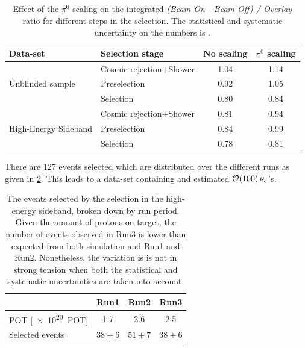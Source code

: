 \begin{table}[htb]
    \centering
    \begin{tabular}{@{}llcc@{}}
\toprule
    Data-set                                  & Selection stage   & No scaling & $\pi^0$ scaling \\ \midrule
\multirow{3}{*}{Unblinded sample}     & Cosmic rejection+Shower & 1.04       & 1.14         \\
                                      & Preselection            & 0.92       & 1.05        \\
                                      & Selection               & 0.80       & 0.84         \\
\multirow{3}{*}{High-Energy Sideband} & Cosmic rejection+Shower & 0.81       & 0.94         \\
                                      & Preselection            & 0.84       & 0.99        \\
                                      & Selection               & 0.78       & 0.81         \\ \bottomrule
\end{tabular} 
    \caption{Effect of the $\pi^0$ scaling on the integrated \textit{(Beam On - Beam Off) / Overlay} ratio for different steps in the selection. The statistical and systematic uncertainty on the numbers is .}
    \label{tab:nuecc:pi0scaling}
\end{table}

There are 127 events selected which are distributed over the different runs as given in \cref{tab:nuecc:sideband_run_sel_events}. This leads to a data-set containing and estimated $\order{100} \, \nu_e$'s.

\begin{table}[htb]
    \centering
\begin{tabular}{@{}lccc@{}}
\toprule
                & Run1 & Run2 & Run3 \\ \midrule
POT [\SI{e20}{POT}]             & 1.7  & 2.6  & 2.5  \\
Selected events & $38\pm6$   & $51\pm7$   & $38\pm6$   \\ \bottomrule
\end{tabular}
    \caption{The events selected by the \nuecc selection in the high-energy sideband, broken down by run period. Given the amount of protons-on-target, the number of events observed in Run3 is lower than expected from both simulation and Run1 and Run2. Nonetheless, the variation is is not in strong tension when both the statistical and systematic uncertainties are taken into account.}
    \label{tab:nuecc:sideband_run_sel_events}
\end{table}


